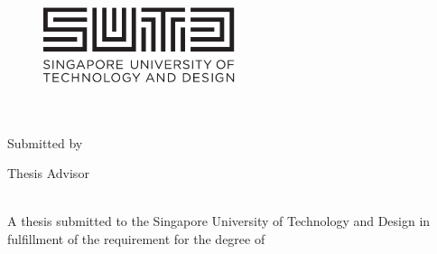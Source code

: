 \documentclass[
11pt, %
oneside, %
english, %
singlespacing, %
headsepline, %
]{MastersDoctoralThesis} %
\author{Hashina Parveen \textsc{D/O Anwar Ali}} %
\begin{document}
\frontmatter %

\pagestyle{plain} %


\begin{titlepage}
	\begin{center}

		\begin{figure}
			\centering
			\includegraphics[width=0.5\textwidth]{Figures/SUTD}
		\end{figure}

		\hfill\break\\[2.0cm]

		{\huge \bfseries \ttitle}\\[3cm] %


		Submitted by\\[1cm]
		\authorname %

		\vspace{3em}

		Thesis Advisor\\[1cm]
		\supname %

		\vspace{3em}

		\pillarname\\[1.5cm] %

		\large{A thesis submitted to the Singapore University of Technology and Design in fulfillment of the requirement for the degree of \degreename}\\[1cm] %


		{\large \the\year}\\[3cm] %

		\vfill
	\end{center}
\end{titlepage}
\end{document}
